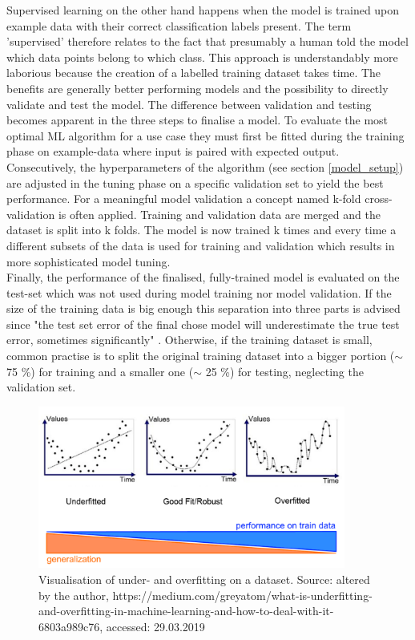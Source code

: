 Supervised learning on the other hand happens when the model is trained upon example data with their correct classification labels present. The term 'supervised' therefore relates to the fact that presumably a human told the model which data points belong to which class. This approach is understandably more laborious because the creation of a labelled training dataset takes time. The benefits are generally better performing models and the possibility to directly validate and test the model. The difference between validation and testing becomes apparent in the three steps to finalise a model. To evaluate the most optimal ML algorithm for a use case they must first be fitted during the training phase on example-data where input is paired with expected output. Consecutively, the hyperparameters of the algorithm (see section \ref{model_setup}) are adjusted in the tuning phase on a specific validation set to yield the best performance. For a meaningful model validation a concept named k-fold cross-validation is often applied. Training and validation data are merged and the dataset is split into k folds. The model is now trained k times and every time a different subsets of the data is used for training and validation which results in more sophisticated model tuning. \\
Finally, the performance of the finalised, fully-trained model is evaluated on the test-set which was not used during model training nor model validation. If the size of the training data is big enough this separation into three parts is advised since "the test set error of the final chose model will underestimate the true test error, sometimes significantly" \parencite[p.222]{Hastie2017}. Otherwise, if the training dataset is small, common practise \parencite{Guido2016} is to split the original training dataset into a bigger portion ($\sim$ 75 \%) for training and a smaller one ($\sim$ 25 \%) for testing, neglecting the validation set.

\begin{figure}[h]
   \centering
   \includegraphics[width=0.9\textwidth]{img/over_underfitting}
   \caption{Visualisation of under- and overfitting on a dataset. Source: altered by the author, https://medium.com/greyatom/what-is-underfitting-and-overfitting-in-machine-learning-and-how-to-deal-with-it-6803a989c76, accessed: 29.03.2019}
   \label{fig:over_underfitting}
\end{figure}

